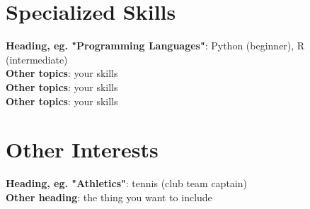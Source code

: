 \documentclass[letterpaper,11pt]{article}
\begin{document}
\section{Specialized Skills}
\begin{itemize}[leftmargin=0.15in, label={}]
    \normalsize{\item{
     \textbf{Heading, eg. "Programming Languages"}{: Python (beginner), R (intermediate)} \\
     \textbf{Other topics}{: your skills}\\
     \textbf{Other topics}{: your skills} \\
     \textbf{Other topics}{: your skills} \\
    }}
 \end{itemize}

\section{Other Interests}
\begin{itemize}[leftmargin=0.15in, label={}]
    \normalsize{\item{
     \textbf{Heading, eg. "Athletics"}{: {tennis (club team captain)} } \\
      \textbf{Other heading}{: {the thing you want to include} } \\
    }}    
 \end{itemize}
\end{document}
